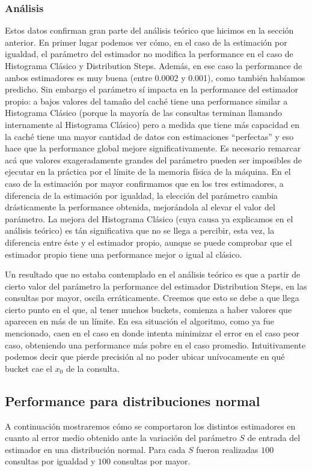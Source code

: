  \subsubsection*{Análisis}
Estos datos confirman gran parte del análisis teórico que hicimos en la sección anterior. En primer lugar podemos ver cómo, en el caso de la estimación por igualdad, el parámetro del estimador no modifica la performance en el caso de Histograma Clásico y Distribution Steps. Además, en ese caso la performance de ambos estimadores es muy buena (entre 0.0002 y 0.001), como también habíamos predicho. 
Sin embargo el parámetro sí impacta en la performance del estimador propio: a bajos valores del tamaño del caché tiene una performance similar a Histograma Clásico (porque la mayoría de las consultas terminan llamando internamente al Histograma Clásico) pero a medida que tiene más capacidad en la caché tiene una mayor cantidad de datos con estimaciones ``perfectas'' y eso hace que la performance global mejore significativamente. Es necesario remarcar acá que valores exageradamente grandes del parámetro pueden ser imposibles de ejecutar en la práctica por el límite de la memoria física de la máquina.
En el caso de la estimación por mayor confirmamos que en los tres estimadores, a diferencia de la estimación por igualdad, la elección del parámetro cambia drásticamente la performance obtenida, mejorándola al elevar el valor del parámetro. La mejora del Histograma Clásico (cuya causa ya explicamos en el análisis teórico) es tán significativa que no se llega a percibir, esta vez, la diferencia entre éste y el estimador propio, aunque se puede comprobar que el estimador propio tiene una performance mejor o igual al clásico.

Un resultado que no estaba contemplado en el análisis teórico es que a partir de cierto valor del parámetro la performance del estimador Distribution Steps, en las consultas por mayor, oscila erráticamente. Creemos que esto se debe a que llega cierto punto en el que, al tener muchos buckets, comienza a haber valores que aparecen en más de un límite. En esa situación el algoritmo, como ya fue mencionado, caen en el caso en donde intenta minimizar el error en el caso peor caso, obteniendo una performance más pobre en el caso promedio. Intuitivamente podemos decir que pierde precisión al no poder ubicar unívocamente en qué bucket cae el $x_0$ de la consulta.
 
 \subsection{Performance para distribuciones normal}
A continuación mostraremos cómo se comportaron los distintos estimadores en cuanto al error medio obtenido ante la variación del parámetro $S$ de entrada del estimador en una distribución normal. Para cada $S$ fueron realizadas $100$ consultas por igualdad y $100$ consultas por mayor.

